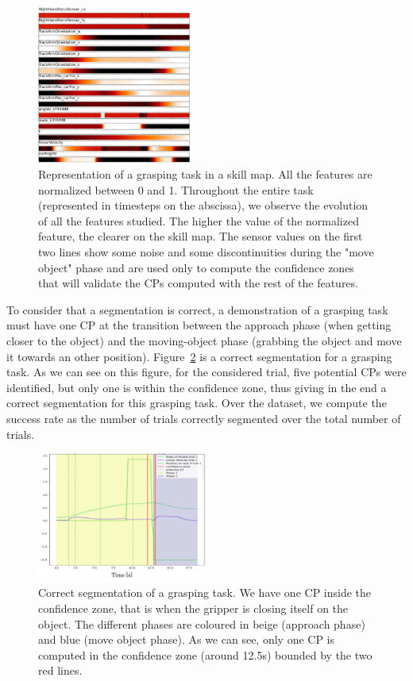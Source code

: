 \documentclass[a4paper, 10pt, conference]{ieeeconf}
\begin{document}
 \begin{figure}[t]
  \centering
  \includegraphics[width=0.45\textwidth]{img/skillMap.pdf}
  \caption{Representation of a grasping task in a skill map. All the features are normalized between 0 and 1. Throughout the entire task (represented in timesteps on the abscissa), we observe the evolution of all the features studied. The higher the value of the normalized feature, the clearer on the skill map. The sensor values on the first two lines show some noise and some discontinuities during the "move object" phase and are used only to compute the confidence zones that will validate the CPs computed with the rest of the features.}
  \label{fig:skillmap}
\end{figure}

To consider that a segmentation is correct, a demonstration of a grasping task must have one CP at the transition between the approach phase (when getting closer to the object) and the moving-object phase (grabbing the object and move it towards an other position). 
Figure~\ref{fig:coloredseg} is a correct segmentation for a grasping task. As we can see on this figure, for the considered trial, five potential CPs were identified, but only one is within the confidence zone, thus giving in the end a correct segmentation for this grasping task. Over the dataset, we compute the success rate as the number of trials correctly segmented over the total number of trials.

\begin{figure}[t]
  \centering
  \includegraphics[width=0.5\textwidth]{img/resolSeg.pdf}
  \caption{Correct segmentation of a grasping task. We have one CP inside the confidence zone, that is when the gripper is closing itself on the object. The different phases are coloured in beige (approach phase) and blue (move object phase). As we can see, only one CP is computed in the confidence zone (around 12.5s) bounded by the two red lines.}
  \label{fig:coloredseg}
\end{figure}
\end{document}
